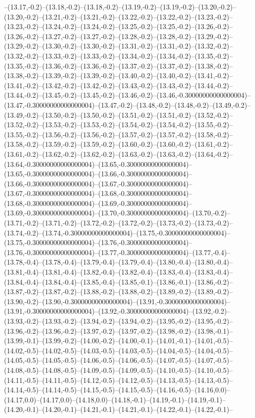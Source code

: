 --(13.17,-0.2)--(13.18,-0.2)--(13.18,-0.2)--(13.19,-0.2)--(13.19,-0.2)--(13.20,-0.2)--(13.20,-0.2)--(13.21,-0.2)--(13.21,-0.2)--(13.22,-0.2)--(13.22,-0.2)--(13.23,-0.2)--(13.23,-0.2)--(13.24,-0.2)--(13.24,-0.2)--(13.25,-0.2)--(13.25,-0.2)--(13.26,-0.2)--(13.26,-0.2)--(13.27,-0.2)--(13.27,-0.2)--(13.28,-0.2)--(13.28,-0.2)--(13.29,-0.2)--(13.29,-0.2)--(13.30,-0.2)--(13.30,-0.2)--(13.31,-0.2)--(13.31,-0.2)--(13.32,-0.2)--(13.32,-0.2)--(13.33,-0.2)--(13.33,-0.2)--(13.34,-0.2)--(13.34,-0.2)--(13.35,-0.2)--(13.35,-0.2)--(13.36,-0.2)--(13.36,-0.2)--(13.37,-0.2)--(13.37,-0.2)--(13.38,-0.2)--(13.38,-0.2)--(13.39,-0.2)--(13.39,-0.2)--(13.40,-0.2)--(13.40,-0.2)--(13.41,-0.2)--(13.41,-0.2)--(13.42,-0.2)--(13.42,-0.2)--(13.43,-0.2)--(13.43,-0.2)--(13.44,-0.2)--(13.44,-0.2)--(13.45,-0.2)--(13.45,-0.2)--(13.46,-0.2)--(13.46,-0.30000000000000004)--(13.47,-0.30000000000000004)--(13.47,-0.2)--(13.48,-0.2)--(13.48,-0.2)--(13.49,-0.2)--(13.49,-0.2)--(13.50,-0.2)--(13.50,-0.2)--(13.51,-0.2)--(13.51,-0.2)--(13.52,-0.2)--(13.52,-0.2)--(13.53,-0.2)--(13.53,-0.2)--(13.54,-0.2)--(13.54,-0.2)--(13.55,-0.2)--(13.55,-0.2)--(13.56,-0.2)--(13.56,-0.2)--(13.57,-0.2)--(13.57,-0.2)--(13.58,-0.2)--(13.58,-0.2)--(13.59,-0.2)--(13.59,-0.2)--(13.60,-0.2)--(13.60,-0.2)--(13.61,-0.2)--(13.61,-0.2)--(13.62,-0.2)--(13.62,-0.2)--(13.63,-0.2)--(13.63,-0.2)--(13.64,-0.2)--(13.64,-0.30000000000000004)--(13.65,-0.30000000000000004)--(13.65,-0.30000000000000004)--(13.66,-0.30000000000000004)--(13.66,-0.30000000000000004)--(13.67,-0.30000000000000004)--(13.67,-0.30000000000000004)--(13.68,-0.30000000000000004)--(13.68,-0.30000000000000004)--(13.69,-0.30000000000000004)--(13.69,-0.30000000000000004)--(13.70,-0.30000000000000004)--(13.70,-0.2)--(13.71,-0.2)--(13.71,-0.2)--(13.72,-0.2)--(13.72,-0.2)--(13.73,-0.2)--(13.73,-0.2)--(13.74,-0.2)--(13.74,-0.30000000000000004)--(13.75,-0.30000000000000004)--(13.75,-0.30000000000000004)--(13.76,-0.30000000000000004)--(13.76,-0.30000000000000004)--(13.77,-0.30000000000000004)--(13.77,-0.4)--(13.78,-0.4)--(13.78,-0.4)--(13.79,-0.4)--(13.79,-0.4)--(13.80,-0.4)--(13.80,-0.4)--(13.81,-0.4)--(13.81,-0.4)--(13.82,-0.4)--(13.82,-0.4)--(13.83,-0.4)--(13.83,-0.4)--(13.84,-0.4)--(13.84,-0.4)--(13.85,-0.4)--(13.85,-0.1)--(13.86,-0.1)--(13.86,-0.2)--(13.87,-0.2)--(13.87,-0.2)--(13.88,-0.2)--(13.88,-0.2)--(13.89,-0.2)--(13.89,-0.2)--(13.90,-0.2)--(13.90,-0.30000000000000004)--(13.91,-0.30000000000000004)--(13.91,-0.30000000000000004)--(13.92,-0.30000000000000004)--(13.92,-0.2)--(13.93,-0.2)--(13.93,-0.2)--(13.94,-0.2)--(13.94,-0.2)--(13.95,-0.2)--(13.95,-0.2)--(13.96,-0.2)--(13.96,-0.2)--(13.97,-0.2)--(13.97,-0.2)--(13.98,-0.2)--(13.98,-0.1)--(13.99,-0.1)--(13.99,-0.2)--(14.00,-0.2)--(14.00,-0.1)--(14.01,-0.1)--(14.01,-0.5)--(14.02,-0.5)--(14.02,-0.5)--(14.03,-0.5)--(14.03,-0.5)--(14.04,-0.5)--(14.04,-0.5)--(14.05,-0.5)--(14.05,-0.5)--(14.06,-0.5)--(14.06,-0.5)--(14.07,-0.5)--(14.07,-0.5)--(14.08,-0.5)--(14.08,-0.5)--(14.09,-0.5)--(14.09,-0.5)--(14.10,-0.5)--(14.10,-0.5)--(14.11,-0.5)--(14.11,-0.5)--(14.12,-0.5)--(14.12,-0.5)--(14.13,-0.5)--(14.13,-0.5)--(14.14,-0.5)--(14.14,-0.5)--(14.15,-0.5)--(14.15,-0.5)--(14.16,-0.5)--(14.16,0.0)--(14.17,0.0)--(14.17,0.0)--(14.18,0.0)--(14.18,-0.1)--(14.19,-0.1)--(14.19,-0.1)--(14.20,-0.1)--(14.20,-0.1)--(14.21,-0.1)--(14.21,-0.1)--(14.22,-0.1)--(14.22,-0.1)--